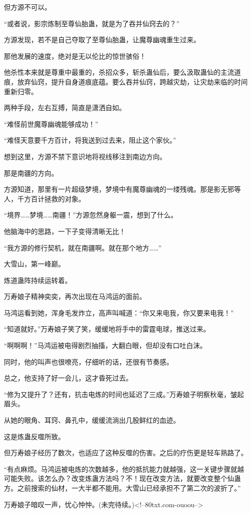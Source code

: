 \begin{this_body}
但方源不可以。

“或者说，影宗炼制至尊仙胎蛊，就是为了吞并仙窍去的？”

方源发现，若不是自己夺取了至尊仙胎蛊，让魔尊幽魂重生过来。

那他发展的速度，绝对是无以伦比的惊世骇俗！

他杀性本来就是尊重中最重的，杀招众多，斩杀蛊仙后，要么汲取蛊仙的主流道痕，放弃仙窍，提升自身道痕底蕴。要么吞并仙窍，跨越灾劫，让灾劫来临的时间重新归零。

两种手段，左右互搏，简直是潇洒自如。

“难怪前世魔尊幽魂能够成功！”

“难怪天意要千方百计，将我送到过去来，阻止这个家伙。”

想到这里，方源不禁下意识地将视线移注到南边方向。

那是南疆的方向。

方源知道，那里有一片超级梦境，梦境中有魔尊幽魂的一缕残魂。那是影无邪等人，千方百计拯救的对象。

“境界……梦境……南疆！”方源忽然身躯一震，想到了什么。

他脑海中的思路，一下子变得清晰无比！

“我方源的修行契机，就在南疆啊。就在那个地方……”

大雪山，第一峰巅。

炼道蛊阵持续运转着。

万寿娘子精神奕奕，再次出现在马鸿运的面前。

马鸿运看到她，浑身毛发炸立，高声叫喊道：“你又来电我，你又要来电我！”

“知道就好。”万寿娘子笑了笑，缓缓地将手中的雷霆电球，推送过来。

“啊啊啊！”马鸿运被电得剧烈抽搐，大翻白眼，但却没有口吐白沫。

同时，他的叫声也很嘹亮，仔细听的话，还很有节奏感。

总之，他支持了好一会儿，这才昏死过去。

“修为又提升了？还有，抗击电炼的时间也延迟了三成。”万寿娘子明察秋毫，皱起眉头。

从她的眼角、耳窍、鼻孔中，缓缓流淌出几股鲜红的血迹。

这是炼蛊反噬所致。

但万寿娘子经历了数次，也适应了这种反噬的伤害。之后的疗伤更是轻车熟路了。

“有点麻烦。马鸿运被电炼的次数越多，他的抵抗能力就越强，这一关键步骤就越可能失败。该怎么办？改变炼蛊方法吗？不！现在改变方法，就要改变整个仙蛊方。之前搜索的仙材，一大半都不能用。大雪山已经承担不了第二次的波折了。”

万寿娘子暗叹一声，忧心忡忡。(未完待续。)<!--80txt.com-ouoou-->

\end{this_body}

